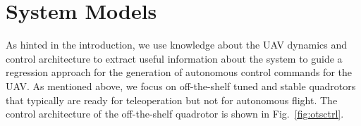 \documentclass[letterpaper, 10 pt, conference]{ieeeconf}  %
\newcommand\NB[1]{$\spadesuit$\footnote{NB: #1}}
\begin{document}
%


\section{System Models} \label{sec:sysdyn}
As hinted in the introduction, we use knowledge about the UAV dynamics and control architecture to extract useful information about the system to guide a regression approach for the generation of autonomous control commands for the UAV. As mentioned above, we focus on off-the-shelf tuned and stable quadrotors that typically are ready for teleoperation but not for autonomous flight. The control architecture of the off-the-shelf quadrotor is shown in Fig.~\ref{fig:otsctrl}.
\end{document}
